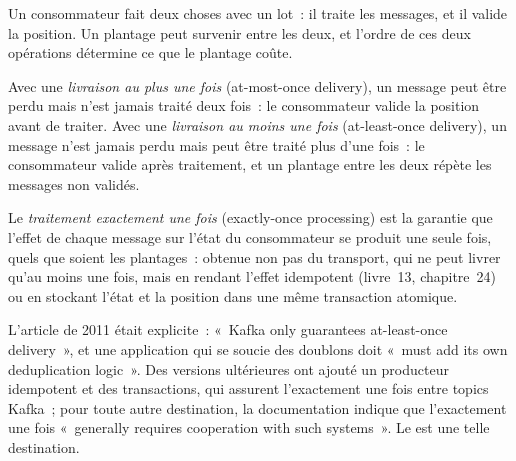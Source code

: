 Un consommateur fait deux choses avec un lot~: il traite les messages, et il valide la position. Un plantage peut survenir entre les deux, et
l'ordre de ces deux opérations détermine ce que le plantage coûte.

\begin{definition}\label{def:pl:messaging-and-event-driven-architecture:delivery}
Avec une \emph{livraison au plus une fois} (at-most-once delivery), un message peut être perdu mais n'est jamais traité deux fois~: le consommateur valide
la position avant de traiter. Avec une \emph{livraison au moins une fois} (at-least-once delivery), un message n'est jamais perdu mais peut être traité plus
d'une fois~: le consommateur valide après traitement, et un plantage entre les deux répète les messages non validés.
\end{definition}

\begin{definition}\label{def:pl:messaging-and-event-driven-architecture:exactly}
Le \emph{traitement exactement une fois} (exactly-once processing) est la garantie que l'effet de chaque message sur l'état du consommateur se produit
une seule fois, quels que soient les plantages~: obtenue non pas du transport, qui ne peut livrer qu'au moins une fois, mais en rendant l'effet idempotent
(livre~13, chapitre~24) ou en stockant l'état et la position dans une même transaction atomique.
\end{definition}

L'article de 2011 était explicite~: «~Kafka only guarantees at-least-once delivery~», et une application qui se soucie des
doublons doit «~must add its own deduplication logic~». Des versions ultérieures ont ajouté un producteur idempotent et des transactions,
qui assurent l'exactement une fois entre topics Kafka~; pour toute autre destination, la documentation indique que l'exactement une fois «~generally
requires cooperation with such systems~». Le  est une telle destination.

\label{lst:pl:messaging-and-event-driven-architecture:modes}

